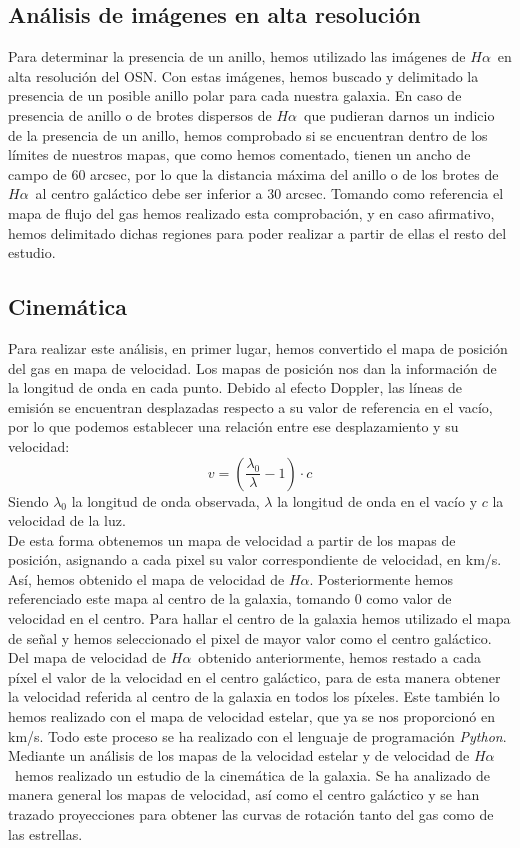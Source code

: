 \documentclass{article}
\newcommand{\hal}{$H\alpha$}
\begin{document}
\subsection{Análisis de imágenes en alta resolución}
Para determinar la presencia de un anillo, hemos utilizado las imágenes de \hal\ en alta resolución del OSN. Con estas imágenes, hemos buscado y delimitado la presencia de un posible anillo polar para cada nuestra galaxia. En caso de presencia de anillo o de brotes dispersos de \hal\ que pudieran darnos un indicio de la presencia de un anillo, hemos comprobado si se encuentran dentro de los límites de nuestros mapas, que como hemos comentado, tienen un ancho de campo de 60 arcsec, por lo que la distancia máxima del anillo o de los brotes de \hal\ al centro galáctico debe ser inferior a 30 arcsec. Tomando como referencia el mapa de flujo del gas hemos realizado esta comprobación, y en caso afirmativo, hemos delimitado dichas regiones para poder realizar a partir de ellas el resto del estudio.
\subsection{Cinemática}
Para realizar este análisis, en primer lugar, hemos convertido el mapa de posición del gas en mapa de velocidad. Los mapas de posición nos dan la información de la longitud de onda en cada punto. Debido al efecto Doppler, las líneas de emisión se encuentran desplazadas respecto a su valor de referencia en el vacío, por lo que podemos establecer una relación entre ese desplazamiento y su velocidad:
\begin{equation}
v=\left(\frac{\lambda_{0}}{\lambda} - 1\right)\cdot c \label{ecuacion_1}
\end{equation}
Siendo $\lambda_{0}$ la longitud de onda observada, $\lambda$ la longitud de onda en el vacío y $c$ la velocidad de la luz.\\De esta forma obtenemos un mapa de velocidad a partir de los mapas de posición, asignando a cada pixel su valor correspondiente de velocidad, en km/s. Así, hemos obtenido el mapa de velocidad de \hal. Posteriormente hemos referenciado este mapa al centro de la galaxia, tomando 0 como valor de velocidad en el centro. Para hallar el centro de la galaxia hemos utilizado el mapa de señal y hemos seleccionado el pixel de mayor valor como el centro galáctico. Del mapa de velocidad de \hal\ obtenido anteriormente, hemos restado a cada píxel el valor de la velocidad en el centro galáctico, para de esta manera obtener la velocidad referida al centro de la galaxia en todos los píxeles. Este también lo hemos realizado con el mapa de velocidad estelar, que ya se nos proporcionó en km/s. Todo este proceso se ha realizado con el lenguaje de programación \emph{Python}.\\Mediante un análisis de los mapas de la velocidad estelar y de velocidad de \hal\ hemos realizado un estudio de la cinemática de la galaxia. Se ha analizado de manera general los mapas de velocidad, así como el centro galáctico y se han trazado proyecciones para obtener las curvas de rotación tanto del gas como de las estrellas.
\end{document}
